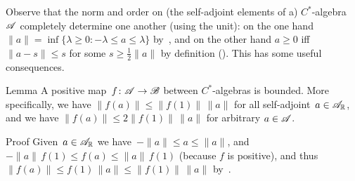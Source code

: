 \documentclass[a]{subfiles}
\begin{document}
\begin{parsec}%
\begin{point}%
Observe that the norm and order on 
(the self-adjoint elements of a) $C^*$-algebra~$\mathscr{A}$
completely determine one another (using the unit):
on the one hand
$\|a\|=\inf\{\lambda\geq 0\colon -\lambda\leq a\leq \lambda\}$
by~,
and on the other hand
$a\geq 0$ iff $\|a-s\|\leq s$ for some $s\geq \frac{1}{2}\|a\|$
by definition ().
This has some useful consequences.
\end{point}
\begin{point}{Lemma}%
A positive map~$f\colon \mathscr{A}\to\mathscr{B}$
between $C^*$-algebras
is bounded.
More specifically,
we have
$\|f(a)\|\leq \|f(1)\|\,\|a\|$
for all self-adjoint~$a\in\mathscr{A}_{\mathbb{R}}$,
and we have $\|f(a)\|\leq 2\|f(1)\|\,\|a\|$
for arbitrary $a\in \mathscr{A}$.
\begin{point}{Proof}%
Given~$a\in\mathscr{A}_{\mathbb{R}}$
we have~$-\|a\|\leq a \leq \|a\|$,
and $-\|a\|\,f(1)\leq f(a)\leq \|a\|\,f(1)$
(because $f$ is positive),
and thus~$\|f(a)\|\leq f(1)\,\|a\|\leq \|f(1)\|\,\|a\|$ 
by~.


\end{point}
\end{point}
\end{parsec}
\end{document}
